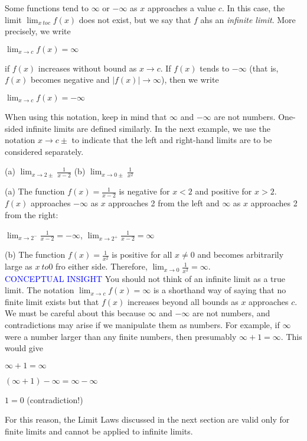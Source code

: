 \documentclass{article}
\begin{document}
Some functions tend to $\infty$ or $-\infty$ as $x$ approaches a value $c$. In this case, the limit $\lim_{x \ to c}f(x)$ does not exist, but we say that $f$ ahs an \textit{infinite limit}. More precisely, we write
\begin{center}$\lim_{x \to c}f(x)=\infty$\end{center}
if $f(x)$ increases without bound as $x \to c$. If $f(x)$ tends to $-\infty$ (that is, $f(x)$ becomes negative and $\left|f(x)\right| \to \infty$), then we write
\begin{center}$\lim_{x \to c}f(x)=-\infty$\end{center}

When using this notation, keep in mind that $\infty$ and $-\infty$ are not numbers. One-sided infinite limits are defined similarly. In the next example, we use the notation $x \to c\pm$ to indicate that the left and right-hand limits are to be considered separately.

\begin{center}(a) $\lim_{x \to 2\pm}\frac{1}{x - 2}$ (b) $\lim_{x \to 0\pm}\frac{1}{x^2}$\end{center}

(a) The function $f(x) = \frac{1}{x - 2}$ is negative for $x < 2$ and positive for $x > 2$. $f(x)$ approaches $-\infty$ as $x$ approaches 2 from the left and $\infty$ as $x$ approaches 2 from the right:
\begin{center}$\lim_{x \to 2^-}\frac{1}{x - 2} = -\infty$, $\lim_{x \to 2^+}\frac{1}{x - 2} = \infty$\end{center}

(b) The function $f(x) = \frac{1}{x^2}$ is positive for all $x \neq 0$ and becomes arbitrarily large as $x\ to 0$ fro either side. Therefore, $\lim_{x \to 0}\frac{1}{x^2} = \infty$.\\

\textcolor{blue}{CONCEPTUAL INSIGHT} You should not think of an infinite limit as a true limit. The notation $\lim_{x\to c}f(x) = \infty$ is a shorthand way of saying that no finite limit exists but that $f(x)$ increases beyond all bounds as $x$ approaches $c$. We must be careful about this because $\infty$ and $-\infty$ are not numbers, and contradictions may arise if we manipulate them as numbers. For example, if $\infty$ were a number larger than any finite numbers, then presumably $\infty + 1 = \infty$. This would give
\begin{center}$\infty + 1 = \infty$\end{center}
\begin{center}$(\infty + 1) - \infty = \infty - \infty$\end{center}
\begin{center}$1 = 0$ (contradiction!)\end{center}
For this reason, the Limit Laws discussed in the next section are valid only for finite limits and cannot be applied to infinite limits.\\
\end{document}
